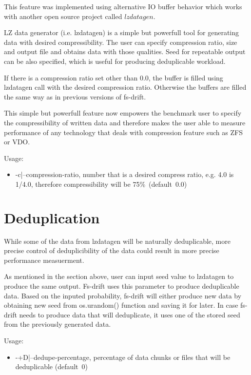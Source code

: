 \documentclass[
  color, %
  table, %
  lof,   %
  lot,   %
]{fithesis3}
\begin{document}
This feature was implemented using alternative IO buffer behavior which works with another open source project called $lzdatagen$.

LZ data generator (i.e. lzdatagen) is a simple but powerfull tool for generating data with desired compressibility. The user can specify compression ratio, size and output file and obtains data with those qualities. Seed for repeatable output can be also specified, which is useful for producing deduplicable workload.

If there is a compression ratio set other than 0.0, the buffer is filled using lzdatagen call with the desired compression ratio. Otherwise the buffers are filled the same way as in previous versions of fs-drift.

This simple but powerfull feature now empowers the benchmark user to specify the compressibility of written data and therefore makes the user able to measure performance of any technology that deals with compression feature such as ZFS or VDO.

Usage:
\begin{itemize}
    \item -c|--compression-ratio, number that is a desired compress ratio, e.g. 4.0 is 1/4.0, therefore compressibility will be 75\%~(default~0.0)
\end{itemize}


\section{Deduplication}
While some of the data from lzdatagen will be naturally deduplicable, more precise control of deduplicibility of the data could result in more precise performance measuerment.

As mentioned in the section above, user can input seed value to lzdatagen to produce the same output. Fs-drift uses this parameter to produce deduplicable data. Based on the inputed probability, fs-drift will either produce new data by obtaining new seed from os.urandom() function and saving it for later. In case fs-drift needs to produce data that will deduplicate, it uses one of the stored seed from the previously generated data.

Usage:
\begin{itemize}
    \item -+D|--dedupe-percentage, percentage of data chunks or files that will be deduplicable (default~0)
\end{itemize}
\end{document}
